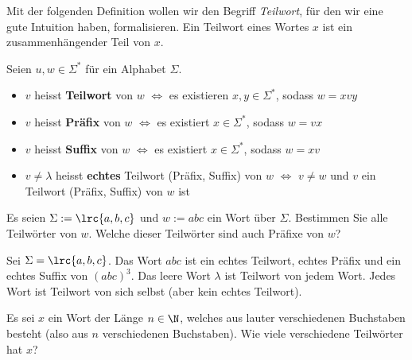 \begin{frame}[fragile]
Mit der folgenden Definition wollen wir den Begriff \textit{Teilwort}, für den wir eine gute Intuition haben, formalisieren. Ein Teilwort eines Wortes $x$ ist ein zusammenhängender Teil von $x$.
\begin{mydefinition}[Teilwörter]\label{mydefinition:Teilwort}
Seien $u,w\in\Sigma^*$ für ein Alphabet $\Sigma$.
\begin{itemize}
	\item $v$ heisst \textbf{Teilwort} von $w$ $\Leftrightarrow$ es existieren $x,y\in\Sigma^*$, sodass $w = xvy$
	\item $v$ heisst \textbf{Präfix} von $w$ $\Leftrightarrow$ es existiert $x\in\Sigma^*$, sodass $w = vx$
	\item $v$ heisst \textbf{Suffix} von $w$ $\Leftrightarrow$ es existiert $x\in\Sigma^*$, sodass $w = xv$
	\item $v\neq \lambda$ heisst \textbf{echtes} Teilwort (Präfix, Suffix) von $w$ $\Leftrightarrow$ $v\neq w$ und $v$ ein Teilwort (Präfix, Suffix) von $w$ ist
\end{itemize}
\end{mydefinition}
\end{frame}

\begin{frame}[fragile]
\begin{myexercise}\label{myexercise:0299}
	Es seien $\Sigma := \lrc{a,b,c}$ und $w := abc$ ein Wort über $\Sigma$. Bestimmen Sie alle Teilwörter von $w$. Welche dieser Teilwörter sind auch Präfixe von $w$?
\end{myexercise}
\end{frame}

\begin{frame}[fragile]
\begin{myexample}
Sei $\Sigma = \lrc{a,b,c}$. Das Wort $abc$ ist ein echtes Teilwort, echtes Präfix und ein echtes Suffix von $(abc)^3$. Das leere Wort $\lambda$ ist Teilwort von jedem Wort. Jedes Wort ist Teilwort von sich selbst (aber kein echtes Teilwort).
\end{myexample}
\end{frame}

\begin{frame}[fragile]
\begin{mychallenge}\label{mychallenge:0207}
	Es sei $x$ ein Wort der Länge $n\in\N$, welches aus lauter verschiedenen Buchstaben besteht (also aus $n$ verschiedenen Buchstaben). Wie viele verschiedene Teilwörter hat $x$?
\end{mychallenge}
\end{frame}

